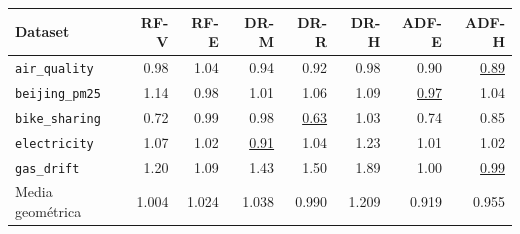 \begin{tabular*}{\textwidth}{@{\extracolsep{\fill}} l rrrrrrr}
\toprule
Dataset & {RF-V} & {RF-E} & {DR-M} & {DR-R} & {DR-H} & {ADF-E} & {ADF-H} \\
\midrule
\texttt{air\_quality} & 0.98 & 1.04 & 0.94 & 0.92 & 0.98 & 0.90 & \underline{0.89} \\
\texttt{beijing\_pm25} & 1.14 & 0.98 & 1.01 & 1.06 & 1.09 & \underline{0.97} & 1.04 \\
\texttt{bike\_sharing} & 0.72 & 0.99 & 0.98 & \underline{0.63} & 1.03 & 0.74 & 0.85 \\
\texttt{electricity} & 1.07 & 1.02 & \underline{0.91} & 1.04 & 1.23 & 1.01 & 1.02 \\
\texttt{gas\_drift} & 1.20 & 1.09 & 1.43 & 1.50 & 1.89 & 1.00 & \underline{0.99} \\
\midrule
Media geométrica & 1.004 & 1.024 & 1.038 & 0.990 & 1.209 & 0.919 & 0.955 \\
\bottomrule
\end{tabular*}
